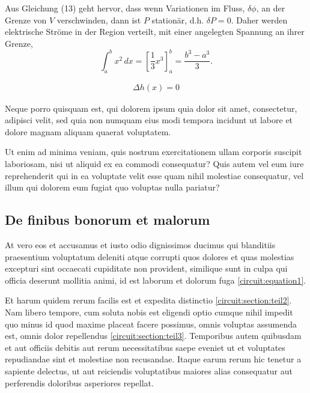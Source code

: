 Aus Gleichung (13) geht hervor, dass wenn Variationen im Fluss, $\delta \phi$, an der Grenze von $V$ verschwinden, dann ist $P$ stationär, d.h. $\delta P=0$. Daher werden elektrische Ströme in der Region verteilt, mit einer angelegten Spannung an ihrer Grenze,
\begin{equation}
\int_a^b x^2\, dx
=
\left[ \frac13 x^3 \right]_a^b
=
\frac{b^3-a^3}3.
\label{circuit:equation1}
\end{equation}





\begin{align*}
	\Delta h(x)=0
\end{align*}



Neque porro quisquam est, qui dolorem ipsum quia dolor sit amet,
consectetur, adipisci velit, sed quia non numquam eius modi tempora
incidunt ut labore et dolore magnam aliquam quaerat voluptatem.

Ut enim ad minima veniam, quis nostrum exercitationem ullam corporis
suscipit laboriosam, nisi ut aliquid ex ea commodi consequatur?
Quis autem vel eum iure reprehenderit qui in ea voluptate velit
esse quam nihil molestiae consequatur, vel illum qui dolorem eum
fugiat quo voluptas nulla pariatur?

\subsection{De finibus bonorum et malorum
\label{circuit:subsection:finibus}}
At vero eos et accusamus et iusto odio dignissimos ducimus qui
blanditiis praesentium voluptatum deleniti atque corrupti quos
dolores et quas molestias excepturi sint occaecati cupiditate non
provident, similique sunt in culpa qui officia deserunt mollitia
animi, id est laborum et dolorum fuga \eqref{circuit:equation1}.

Et harum quidem rerum facilis est et expedita distinctio
\ref{circuit:section:teil2}.
Nam libero tempore, cum soluta nobis est eligendi optio cumque nihil
impedit quo minus id quod maxime placeat facere possimus, omnis
voluptas assumenda est, omnis dolor repellendus
\ref{circuit:section:teil3}.
Temporibus autem quibusdam et aut officiis debitis aut rerum
necessitatibus saepe eveniet ut et voluptates repudiandae sint et
molestiae non recusandae.
Itaque earum rerum hic tenetur a sapiente delectus, ut aut reiciendis
voluptatibus maiores alias consequatur aut perferendis doloribus
asperiores repellat.



